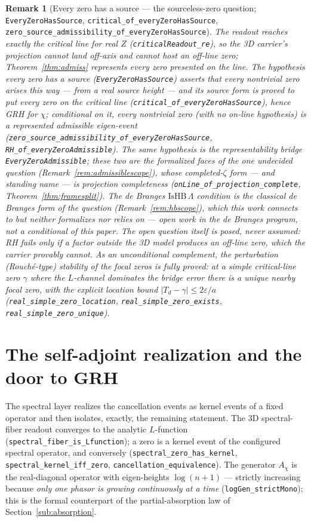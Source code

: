 \documentclass[11pt]{article}
\newtheorem{remark}[definition]{Remark}
\newcommand{\code}[1]{\texttt{#1}}
\begin{document}
\begin{remark}[Every zero has a source --- the sourceless-zero question; \code{EveryZeroHasSource}, \code{critical\_of\_everyZeroHasSource}, \code{zero\_source\_admissibility\_of\_everyZeroHasSource}]\label{rem:bridge}
The readout reaches \emph{exactly} the critical line for real $Z$ (\code{criticalReadout\_re}), so the
3D carrier's projection cannot land off-axis and cannot host an off-line zero; Theorem~\ref{thm:admiss}
represents every zero \emph{presented on} the line. The hypothesis \emph{every zero has a source}
(\code{EveryZeroHasSource}) asserts that every nontrivial zero arises this way --- from a real source
height --- and its source form is proved to put every zero on the critical line
(\code{critical\_of\_everyZeroHasSource}), hence GRH for $\chi$; conditional on it, \emph{every}
nontrivial zero (with no on-line hypothesis) is a represented admissible eigen-event
(\code{zero\_source\_admissibility\_of\_everyZeroHasSource}, \code{RH\_of\_everyZeroAdmissible}). The same
hypothesis is the representability bridge \code{EveryZeroAdmissible}; these two are the \emph{formalized}
faces of the one undecided question (Remark~\ref{rem:admissiblescope}), whose completed-$\zeta$
form --- and standing name --- is \emph{projection completeness}
(\code{onLine\_of\_projection\_complete}, Theorem~\ref{thm:framesplit}). The de Branges
$\mathrm{IsHB}\,\Lambda$ condition is the classical de Branges form of the question
(Remark~\ref{rem:hbscope}), which this work connects to but neither formalizes nor relies on --- open
work in the de Branges program, not a conditional of this paper. The open question itself is posed,
never assumed: RH fails only if a factor outside the
3D model produces an off-line zero, which the carrier provably cannot. As an unconditional complement, the perturbation (Rouch\'e-type)
stability of the focal zeros is fully proved: at a simple critical-line zero $\gamma$ where the
$L$-channel dominates the bridge error there is a unique nearby focal zero, with the explicit location
bound $|T_d-\gamma|\le 2\varepsilon/a$ (\code{real\_simple\_zero\_location}, \code{real\_simple\_zero\_exists},
\code{real\_simple\_zero\_unique}).
\end{remark}

\section{The self-adjoint realization and the door to GRH}\label{sec:spectralGRH}

The spectral layer realizes the cancellation events as kernel events of a fixed operator and then
isolates, exactly, the remaining statement.  The 3D spectral-fiber readout converges to the
analytic $L$-function (\code{spectral\_fiber\_is\_Lfunction}); a zero is a kernel event of the
configured spectral operator, and conversely (\code{spectral\_zero\_has\_kernel},
\code{spectral\_kernel\_iff\_zero}, \code{cancellation\_equivalence}).  The generator $A_\chi$ is
the real-diagonal operator with eigen-heights $\log(n+1)$ --- strictly increasing because
\emph{only one phasor is growing continuously at a time} (\code{logGen\_strictMono}); this is the
formal counterpart of the partial-absorption law of Section~\ref{sub:absorption}.
\end{document}
